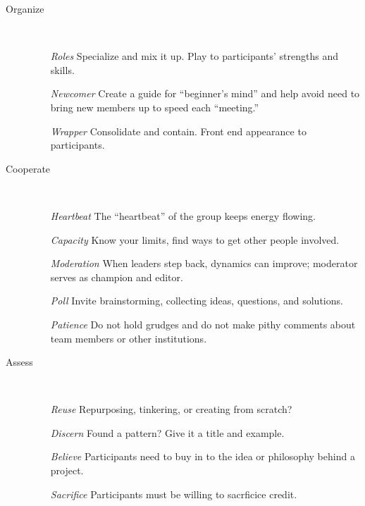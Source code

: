 \documentclass{acm_proc_article-sp}
\begin{document}
\hspace{.2in}
\begin{minipage}{.4\textwidth}
\begin{description}
\item[Organize] \quad \\[-.1in]
\begin{itemize}
\item[\emph{Roles}] Specialize and mix it up. Play to participants' strengths and skills.
\item[\emph{Newcomer}] Create a guide for ``beginner's mind'' and help avoid
  need to bring new members up to speed each ``meeting.''
\item[\emph{Wrapper}] Consolidate and contain. Front end appearance to
  participants.
\end{itemize}
\end{description}
\end{minipage}

\hspace{.2in}
\begin{minipage}{.4\textwidth}
\begin{description}
\item[Cooperate] \quad \\[-.1in]
\begin{itemize}
\item[\emph{Heartbeat}] The ``heartbeat'' of the group keeps energy flowing.
\item[\emph{Capacity}] Know your limits, find ways to get other people
  involved.
\item[\emph{Moderation}] When leaders step back, dynamics can improve;
  moderator serves as champion and editor.
\item[\emph{Poll}] Invite brainstorming, collecting ideas, questions, and
  solutions.
\item[\emph{Patience}] Do not hold grudges and do not make pithy comments
  about team members or other institutions.
\end{itemize}
\end{description}
\end{minipage}

\hspace{.2in}
\begin{minipage}{.4\textwidth}
\begin{description}
\item[Assess]  \quad \\[-.1in]
\begin{itemize}
\item[\emph{Reuse}] Repurposing, tinkering, or creating from scratch?
\item[\emph{Discern}] Found a pattern? Give it a title and example.
\item[\emph{Believe}] Participants need to buy in to the idea or philosophy behind a project.
\item[\emph{Sacrifice}] Participants must be willing to sacrficice credit.
\end{itemize}
\end{description}
\end{minipage}
\end{document}
